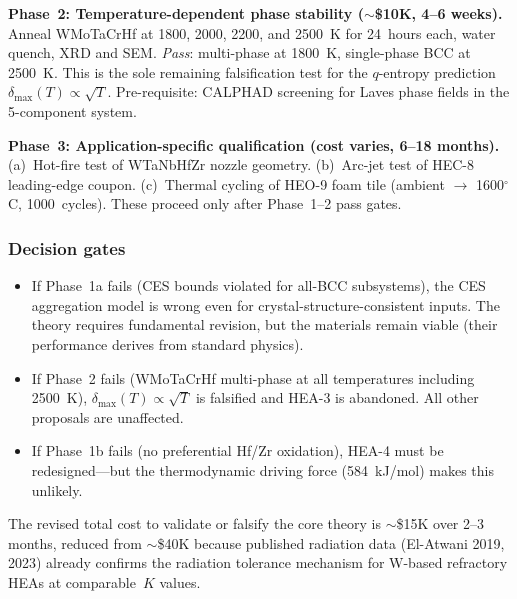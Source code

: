 \documentclass[12pt,letterpaper]{article}
\theoremstyle{definition}
\begin{document}
\textbf{Phase~2: Temperature-dependent phase stability ($\sim$\$10K, 4--6 weeks).}  Anneal WMoTaCrHf at 1800, 2000, 2200, and 2500~K for 24~hours each, water quench, XRD and SEM\@.  \emph{Pass}: multi-phase at 1800~K, single-phase BCC at 2500~K.  This is the sole remaining falsification test for the $q$-entropy prediction $\delta_{\max}(T) \propto \sqrt{T}$.  Pre-requisite: CALPHAD screening for Laves phase fields in the 5-component system.

\textbf{Phase~3: Application-specific qualification (cost varies, 6--18 months).}  (a)~Hot-fire test of WTaNbHfZr nozzle geometry.  (b)~Arc-jet test of HEC-8 leading-edge coupon.  (c)~Thermal cycling of HEO-9 foam tile (ambient $\to$ 1600$^\circ$C, 1000~cycles).  These proceed only after Phase~1--2 pass gates.

\subsubsection{Decision gates}

\begin{itemize}
  \item If Phase~1a fails (CES bounds violated for all-BCC subsystems), the CES aggregation model is wrong even for crystal-structure-consistent inputs.  The theory requires fundamental revision, but the materials remain viable (their performance derives from standard physics).
  \item If Phase~2 fails (WMoTaCrHf multi-phase at all temperatures including 2500~K), $\delta_{\max}(T) \propto \sqrt{T}$ is falsified and HEA-3 is abandoned.  All other proposals are unaffected.
  \item If Phase~1b fails (no preferential Hf/Zr oxidation), HEA-4 must be redesigned---but the thermodynamic driving force (584~kJ/mol) makes this unlikely.
\end{itemize}

The revised total cost to validate or falsify the core theory is $\sim$\$15K over 2--3 months, reduced from $\sim$\$40K because published radiation data (El-Atwani 2019, 2023) already confirms the radiation tolerance mechanism for W-based refractory HEAs at comparable~$K$ values.
\end{document}
